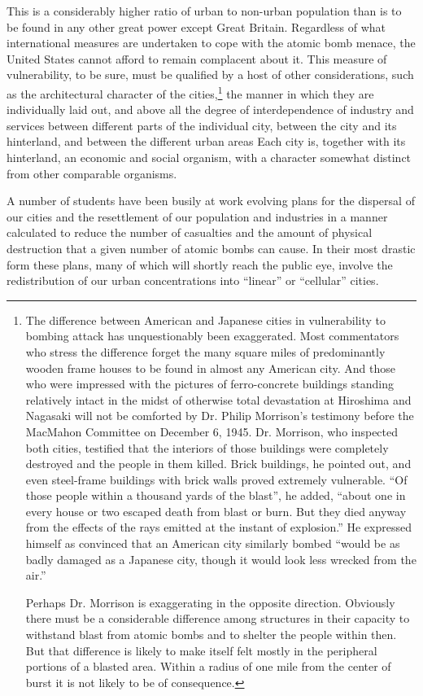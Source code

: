 This is a considerably higher ratio of urban to non-urban population than is to be found in any other great power except Great Britain. Regardless of what international measures are undertaken to cope with the atomic bomb menace, the United States cannot afford to remain complacent about it. This measure of vulnerability, to be sure, must be qualified by a host of other considerations, such as the architectural character of the cities,\footnote{The difference between American and Japanese cities in vulnerability to bombing attack has unquestionably been exaggerated. Most commentators who stress the difference forget the many square miles of predominantly wooden frame houses to be found in almost any American city. And those who were impressed with the pictures of ferro-concrete buildings standing relatively intact in the midst of otherwise total devastation at Hiroshima and Nagasaki will not be comforted by Dr. Philip Morrison's testimony before the MacMahon Committee on December 6, 1945. Dr. Morrison, who inspected both cities, testified that the interiors of those buildings were completely destroyed and the people in them killed. Brick buildings, he pointed out, and even steel-frame buildings with brick walls proved extremely vulnerable. ``Of those people within a thousand yards of the blast'', he added, ``about one in every house or two escaped death from blast or burn. But they died anyway from the effects of the rays emitted at the instant of explosion.'' He expressed himself as convinced that an American city similarly bombed ``would be as badly damaged as a Japanese city, though it would look less wrecked from the air.''

Perhaps Dr. Morrison is exaggerating in the opposite direction. Obviously there must be a considerable difference among structures in their capacity to withstand blast from atomic bombs and to shelter the people within then. But that difference is likely to make itself felt mostly in the peripheral portions of a blasted area. Within a radius of one mile from the center of burst it is not likely to be of consequence.} the manner in which they are individually laid out, and above all the degree of interdependence of industry and services between different parts of the individual city, between the city and its hinterland, and between the different urban areas Each city is, together with its hinterland, an economic and social organism, with a character somewhat distinct from other comparable organisms.

A number of students have been busily at work evolving plans for the dispersal of our cities and the resettlement of our population and industries in a manner calculated to reduce the number of casualties and the amount of physical destruction that a given number of atomic bombs can cause. In their most drastic form these plans, many of which will shortly reach the public eye, involve the redistribution of our urban concentrations into ``linear'' or ``cellular'' cities.

